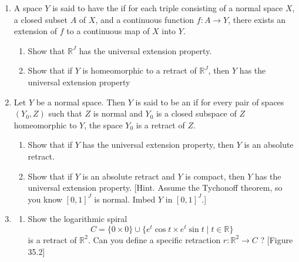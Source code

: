 \begin{enumerate}[itemsep=0.4em, parsep=0pt, topsep=0pt, partopsep=0pt, leftmargin=*, label=\arabic*., ref=\arabic*]
\begin{enumerate}[itemsep=0.2em, parsep=0pt, topsep=0pt, partopsep=0pt, leftmargin=*, label=(\alph*), align=left]
 \end{enumerate}
\item A space \(Y\) is said to have the  if for each triple consisting of a normal space \(X\), a closed subset \(A\) of \(X\), and a continuous function \(f : A \rightarrow Y\), there exists an extension of \(f\) to a continuous map of \(X\) into \(Y\).
 \begin{enumerate}[itemsep=0.2em, parsep=0pt, topsep=0pt, partopsep=0pt, leftmargin=*, label=(\alph*), align=left]
 \item Show that \(\mathbb{R}^{J}\) has the universal extension property.
 \item Show that if \(Y\) is homeomorphic to a retract of \(\mathbb{R}^{J}\), then \(Y\) has the universal extension property
 \end{enumerate}
\item Let \(Y\) be a normal space. Then \(Y\) is said to be an  if for every pair of spaces \(( {Y_{0},Z})\) such that \(Z\) is normal and \(Y_{0}\) is a closed subspace of \(Z\) homeomorphic to \(Y\), the space \(Y_{0}\) is a retract of \(Z\).
 \begin{enumerate}[itemsep=0.2em, parsep=0pt, topsep=0pt, partopsep=0pt, leftmargin=*, label=(\alph*), align=left]
 \item Show that if \(Y\) has the universal extension property, then \(Y\) is an absolute retract.
 \item Show that if \(Y\) is an absolute retract and \(Y\) is compact, then \(Y\) has the universal extension property. [Hint. Assume the Tychonoff theorem, so you know \({[ 0,1] }^{J}\) is normal. Imbed \(Y\) in \({[ 0,1] }^{J}\).]
 \end{enumerate}
\item
 \begin{enumerate}[itemsep=0.2em, parsep=0pt, topsep=0pt, partopsep=0pt, leftmargin=*, label=(\alph*), align=left]
 \item Show the logarithmic spiral \[ C = \{ 0 \times 0\} \cup \{ {e^{t}\cos t \times {e}^{t}\sin t \mid t \in \mathbb{R}}\} \] is a retract of \(\mathbb{R}^{2}\). Can you define a specific retraction \(r : \mathbb{R}^{2} \rightarrow C\) ? [Figure 35.2]


\end{enumerate}
\end{enumerate}
